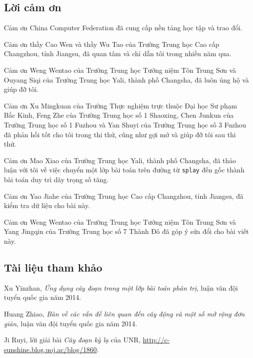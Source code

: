 \documentclass[11pt]{article}
\begin{document}
\subsection{Lời cảm ơn}

Cảm ơn China Computer Federation đã cung cấp nền tảng học tập và trao đổi.

Cảm ơn thầy Cao Wen và thầy Wu Tao của Trường Trung học Cao cấp Changzhou,
tỉnh Jiangsu, đã quan tâm và chỉ dẫn tôi trong nhiều năm qua.

Cảm ơn Weng Wentao của Trường Trung học Tưởng niệm Tôn Trung Sơn và Ouyang
Siqi của Trường Trung học Yali, thành phố Changsha, đã luôn ủng hộ và giúp đỡ
tôi.

Cảm ơn Xu Mingkuan của Trường Thực nghiệm trực thuộc Đại học Sư phạm Bắc Kinh,
Feng Zhe của Trường Trung học số 1 Shaoxing, Chen Junkun của Trường Trung học
số 1 Fuzhou và Yan Shuyi của Trường Trung học số 3 Fuzhou đã phản hồi tốt cho
tôi trong thi thử, cũng như gợi mở và giúp đỡ tôi sau thi thử.

Cảm ơn Mao Xiao của Trường Trung học Yali, thành phố Changsha, đã thảo luận với
tôi về việc chuyển một lớp bài toán trên đường từ \texttt{splay} đến gốc thành
bài toán duy trì dãy trọng số tăng.

Cảm ơn Yao Jiahe của Trường Trung học Cao cấp Changzhou, tỉnh Jiangsu, đã kiểm
tra dữ liệu cho bài này.

Cảm ơn Weng Wentao của Trường Trung học Tưởng niệm Tôn Trung Sơn và Yang
Jingqin của Trường Trung học số 7 Thành Đô đã góp ý sửa đổi cho bài viết này.

\subsection*{Tài liệu tham khảo}

\begin{enumerate}[label={[\arabic*]}]
  \item Xu Yinzhan, \emph{Ứng dụng cây đoạn trong một lớp bài toán phân trị},
  luận văn đội tuyển quốc gia năm 2014.

  \item Huang Zhiao, \emph{Bàn về các vấn đề liên quan đến cây động và một số
  mở rộng đơn giản}, luận văn đội tuyển quốc gia năm 2014.

  \item Ji Ruyi, lời giải bài \emph{Cây đoạn kỳ lạ} của UNR,
  \url{http://c-sunshine.blog.uoj.ac/blog/1860}.
\end{enumerate}
\end{document}
